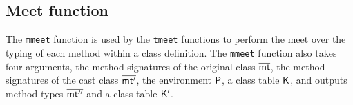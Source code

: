 \documentclass[a4paper,USenglish]{tex/lipics-v2016}
\begin{document}
\subsection{Meet function}\label{monmeet}

The \texttt{mmeet} function is used by the \texttt{tmeet} functions to
perform the meet over the typing of each method within a class definition.
The \texttt{mmeet} function also takes four arguments, the method
signatures of the original class $\b\mt$, the method signatures of the cast
class $\b\mtp$, the environment $\P$, a class table $\K$, and outputs method
types $\b\mtpp$ and a class table $\Kp$. \\


\opdef{
  $\mmeet{\b\mt}{\b\mtp}\P\K = \b\mtpp\,\Kp$
}{
}
\begin{mathpar}






\end{mathpar}
\\
\end{document}
